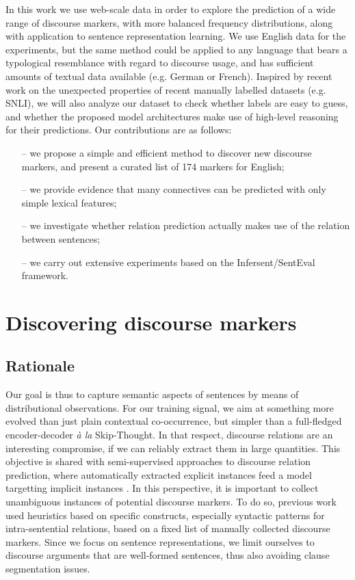 \documentclass[11pt,a4paper]{article}
\begin{document}
In this work we use web-scale data in order to explore the prediction of a wide range of discourse markers, with more balanced frequency distributions, along with application to sentence representation learning. 
We use English data for the experiments, but the same method could be applied to any language that bears a typological resemblance with regard to discourse usage, and has sufficient amounts of textual data available (e.g. German or French). Inspired by recent work  \citep{Dasgupta2018,Poliak2018, Levy2018, Glockner2018} on the unexpected properties of recent manually labelled datasets (e.g. SNLI), we will also analyze our dataset to check whether labels are easy to guess, and whether the proposed model architectures make use of high-level reasoning for their predictions. Our contributions are as follows:
\begin{itemize}
\item[--]  we propose a simple and efficient method to discover new discourse markers, and present a curated list of 174 markers for English;
\item[--]  we provide evidence that many connectives can be predicted with only simple lexical features;
\item[--]  we investigate whether relation prediction actually makes use of the relation between sentences;
\item[--]  we carry out extensive experiments based on the Infersent/SentEval framework.
\end{itemize}


\section{Discovering discourse markers}
\subsection{Rationale}
Our goal is thus to capture semantic aspects of sentences by means of distributional observations. For our training signal, we aim at something more evolved than just plain contextual co-occurrence, but simpler than a full-fledged encoder-decoder {\it \`{a} la} Skip-Thought. In that respect, discourse relations are an interesting compromise, if we can reliably extract them in large quantities. This objective is shared with semi-supervised approaches to discourse relation prediction, where automatically extracted explicit instances feed a model targetting implicit instances \cite{marcu2002unsupervised,DBLP:journals/nle/SporlederL08,DBLP:conf/acl/PitlerN09,RutherfordX15}. In this perspective, it is important to collect unambiguous instances of potential discourse markers. To do so, previous work used heuristics based on specific constructs, especially syntactic patterns for intra-sentential relations, based on a fixed list of manually collected discourse markers. Since we focus on sentence representations, we limit ourselves to discourse arguments that are well-formed sentences, thus also avoiding clause segmentation issues.  
\end{document}
